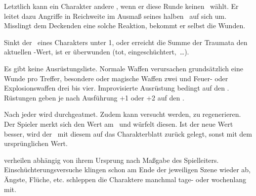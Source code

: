{		Letztlich kann ein Charakter andere , wenn er diese Runde keinen \AD\ wählt. Er leitet dazu Angriffe in Reichweite im Ausmaß seines halben \RD\ auf sich um. Misslingt dem Deckenden eine solche Reaktion, bekommt er selbst die Wunden.

		Sinkt der \HD\ eines Charakters unter 1, oder erreicht die Summe der Traumata den aktuellen \HD-Wert, ist er überwunden (tot, eingeschüchtert,~\ldots).


		\noindent
		Es gibt keine Ausrüstungsliste. Normale Waffen verursachen grundsätzlich eine Wunde pro Treffer, besondere oder magische Waffen zwei und Feuer- oder Explosionswaffen drei bis vier. Improvisierte Ausrüstung bedingt  auf den \AD. Rüstungen geben je nach Ausführung +1 oder +2 auf den \RD.


		\noindent
		Nach jeder  wird durchgeatmet. Zudem kann versucht werden, zu regenerieren. Der Spieler merkt sich den Wert am \HD\ und würfelt diesen. Ist der neue Wert besser, wird der \HD\ mit diesem auf das Charakterblatt zurück gelegt, sonst mit dem ursprünglichen Wert.

		 verheilen abhängig von ihrem Ursprung nach Maßgabe des Spielleiters. Einschüchterungsversuche klingen schon am Ende der jeweiligen Szene wieder ab, Ängste, Flüche, etc. schleppen die Charaktere manchmal tage- oder wochenlang mit.
}

